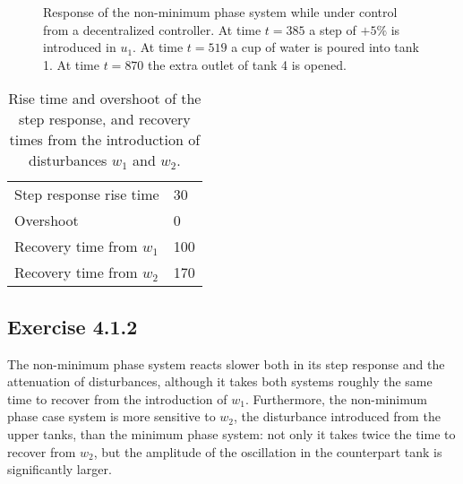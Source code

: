\begin{figure}[H]\centering
  
  \caption{Response of the non-minimum phase system while under control from a
    decentralized controller. At time $t = 385$ a step of $+5\%$ is introduced
    in $u_1$. At time $t = 519$ a cup of water is poured into tank 1. At time
    $t = 870$ the extra outlet of tank 4 is opened.}
  \label{fig:nmp_411}
\end{figure}

\begin{table}[H]\centering
    \begin{tabular}{l|l}
    Step response rise time     & 30 \\
    Overshoot                   & 0   \\
    Recovery time from $w_1$    & 100 \\
    Recovery time from $w_2$    & 170 \\
    \end{tabular}
    \caption{Rise time and overshoot of the step response, and recovery times
      from the introduction of disturbances $w_1$ and $w_2$.}
    \label{tbl:nmp_411}
\end{table}


\subsection*{Exercise 4.1.2}
The non-minimum phase system reacts slower both in its step response and the
attenuation of disturbances, although it takes both systems roughly the same
time to recover from the introduction of $w_1$. Furthermore, the non-minimum
phase case system is more sensitive to $w_2$, the disturbance introduced from
the upper tanks, than the minimum phase system: not only it takes twice the
time to recover from $w_2$, but the amplitude of the oscillation in the
counterpart tank is significantly larger.
